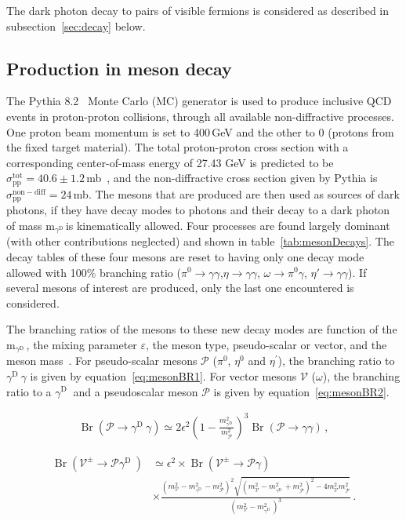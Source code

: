 \documentclass[12pt,a4paper]{article}
\newcommand{\mathDP}{\gamma^{\mathrm{D}}\ }
\newcommand{\DP}{$\mathDP$}
\newcommand{\mDP}{m$_{\mathDP}$}
\newcommand{\Br}{\mathop\mathrm{Br}}
\begin{document}
The dark photon decay to pairs of visible fermions is considered as
described in subsection~\ref{sec:decay} below.


\subsection{Production in meson decay}
\label{sec:meson}

The Pythia 8.2~\cite{Sjostrand:2014zea} Monte Carlo (MC) generator is
used to produce inclusive QCD events in proton-proton collisions,
through all available non-diffractive processes. One proton beam
momentum is set to 400\,GeV and the other to 0 (protons from the fixed
target material). The total proton-proton cross section with a
corresponding center-of-mass energy of 27.43 GeV is predicted to be
$\sigma_{\mathrm{pp}}^{\mathrm{tot}} = 40.6 \pm
1.2$\,mb~\cite{Patrignani:2016xqp}, and the non-diffractive cross
section given by Pythia is $\sigma_{\mathrm{pp}}^{\mathrm{non-diff}} =
24$\,mb. The mesons that are produced are then used as sources of dark
photons, if they have decay modes to photons and their decay to a dark
photon of mass \mDP is kinematically allowed. Four processes are found
largely dominant (with other contributions neglected) and shown in
table~\ref{tab:mesonDecays}. The decay tables of these four mesons are
reset to having only one decay mode allowed with 100\% branching ratio
($\pi^{0}\rightarrow \gamma\gamma $,$\eta\rightarrow \gamma\gamma $,
$\omega\rightarrow \pi^{0}\gamma $, $\eta'\rightarrow \gamma\gamma
$). If several mesons of interest are produced, only the last one
encountered is considered.

The branching ratios of the mesons to these new decay modes are
function of the \mDP, the mixing parameter $\varepsilon$, the meson
type, pseudo-scalar or vector, and the meson
mass~\cite{Batell:2009di,Gorbunov:2014wqa}. For pseudo-scalar mesons
$\mathcal{P}$ ($\pi^0$, $\eta^0$ and $\eta^{\prime}$), the branching
ratio to \DP$\gamma$ is given by equation~\ref{eq:mesonBR1}. For
vector mesons $\mathcal{V}$ ($\omega$), the branching ratio to a \DP
and a pseudoscalar meson $\mathcal{P}$ is given by
equation~\ref{eq:mesonBR2}.

\begin{align}
	\Br(\mathcal{P}\to \mathDP \gamma)\simeq 2\epsilon^2\left ( 1-\frac{m_{\mathDP}^2}{m_{\mathcal{P}}^2} \right )^3 \Br(\mathcal{P}\to\gamma\gamma)\,,\label{eq:mesonBR1}
\end{align}

\begin{align}
\Br(\mathcal{V}^\pm\to \mathcal{P} \mathDP ) & \simeq \epsilon^2\times \Br(\mathcal{V}^\pm\to \mathcal{P} \gamma)\label{eq:mesonBR2} \\ 
&\times\frac{(m_{\mathcal{V}}^2-m_{\mathDP}^2-m_{\mathcal{P}}^2)^2\sqrt{(m_{\mathcal{V}}^2-m_{\mathDP}^2+m_{\mathcal{P}}^2)^2-4m_{\mathcal{V}}^2m_{\mathcal{P}}^2}}{(m_{\mathcal{V}}^2-m_{\mathDP}^2)^3}\,.\nonumber
\end{align}
\end{document}
